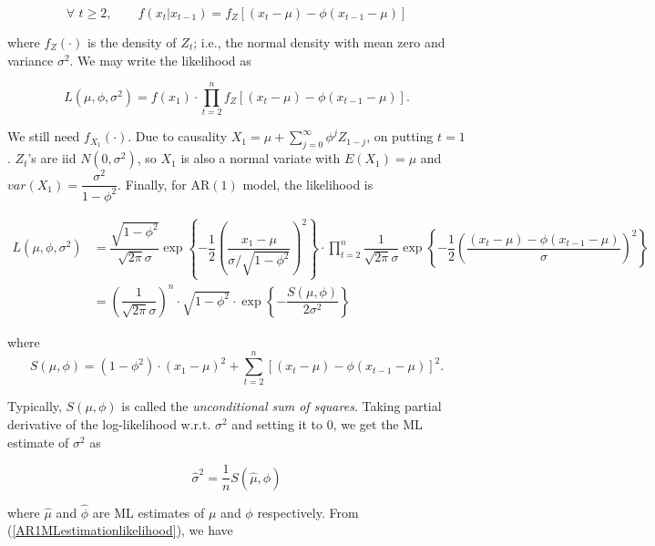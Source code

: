 \documentclass[11pt, a4paper]{article}
\numberwithin{equation}{section}
\theoremstyle{definition}
\begin{document}
\begin{equation}
\forall \,\, t \geq 2, \qquad f(x_t | x_{t-1}) = f_Z\left[ (x_t - \mu) - \phi(x_{t-1} - \mu) \right]
\end{equation}

where $f_Z(\cdot)$ is the density of $Z_t$; i.e., the normal density with mean zero and variance $\sigma^2$. We may write the likelihood as

\begin{equation}
L(\mu, \phi, \sigma^2) = f(x_1) \cdot \prod \limits_{t = 2}^{n} f_Z\left[ (x_t - \mu) - \phi(x_{t-1} - \mu) \right].
\end{equation}

We still need $f_{X_1} (\cdot)$. Due to causality $X_1 = \mu + \sum \limits_{j = 0}^{\infty} \phi^j Z_{1 - j}$, on putting $t = 1$. $Z_t$'s are iid $N(0, \sigma^2)$, so $X_1$ is also a normal variate with $E(X_1) = \mu$ and $var(X_1) = \dfrac{\sigma^2}{1 - \phi^2}$. Finally, for AR$(1)$ model, the likelihood is

\begin{align}
L(\mu, \phi, \sigma^2) &= \dfrac{\sqrt{1 - \phi^2}}{\sqrt{2\pi} \sigma} \exp \left\{-\dfrac{1}{2} \left( \dfrac{x_1 - \mu}{\sigma / \sqrt{1 - \phi^2}}\right)^2\right\} \cdot \prod \limits_{t = 2}^{n} \dfrac{1}{\sqrt{2 \pi} \sigma} \exp \left\{ - \dfrac{1}{2} \left( \dfrac{(x_t - \mu) - \phi(x_{t-1} - \mu)}{\sigma} \right)^2\right\} \nonumber \\[1em]
&= \left( \dfrac{1}{\sqrt{2 \pi} \sigma} \right)^n \cdot \sqrt{1 - \phi^2} \cdot \exp \left\{ - \dfrac{S(\mu, \phi)}{2 \sigma^2} \right\} \label{AR1MLestimationlikelihood}
\end{align}

where 
\begin{equation}\label{unconditional_sum_of_squares_AR_1_MLE}
S(\mu, \phi) = \left( 1 - \phi^2 \right) \cdot \left( x_1 - \mu \right)^2 + \sum \limits_{t = 2}^{n} \left[ (x_t - \mu) - \phi(x_{t-1} - \mu) \right]^2.
\end{equation}

Typically, $S(\mu, \phi)$ is called the \textit{unconditional sum of squares}. Taking partial derivative of the log-likelihood w.r.t. $\sigma^2$ and setting it to $0$, we get the ML estimate of $\sigma^2$ as

\begin{equation}
\hat{\sigma}^2 = \dfrac{1}{n} S(\hat{\mu}, \hat{\phi})
\end{equation}

where $\hat{\mu}$ and $\hat{\phi}$ are ML estimates of $\mu$ and $\phi$ respectively. From (\ref{AR1MLestimationlikelihood}), we have
\end{document}
